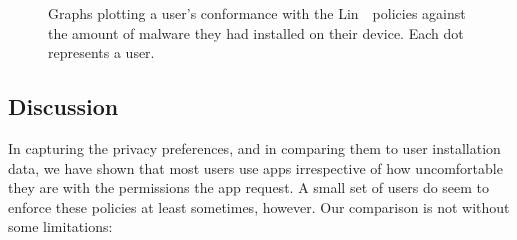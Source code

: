 \documentclass[thesis.tex]{subfiles}
\begin{document}
\begin{figure}
{  }
  \vspace{2em}
  \caption[Plots of conformance to policies against malware installed.]{Graphs plotting a user's conformance with the Lin~\etal~policies against the amount of malware they had installed on their device.  Each dot represents a user.}
  \label{fig:lin_malware_graphs}
\end{figure}

\subsection{Discussion}

In capturing the privacy preferences, and in comparing them to user
installation data, we have shown that most users use apps irrespective
of how uncomfortable they are with the permissions the app request.  A
small set of users do seem to enforce these policies at least
sometimes, however.  Our comparison is not without some limitations:
\end{document}
